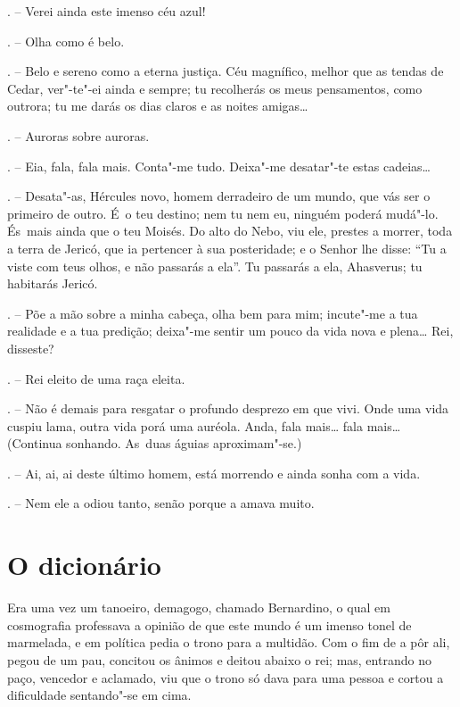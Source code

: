 \begin{Parskip}
. -- Verei ainda este imenso céu azul!

. -- Olha como é belo.

. -- Belo e sereno como a eterna justiça. Céu magnífico, melhor
que as tendas de Cedar, ver"-te"-ei ainda e sempre; tu recolherás os meus
pensamentos, como outrora; tu me darás os dias claros e as noites
amigas\ldots{}

. -- Auroras sobre auroras.

. -- Eia, fala, fala mais. Conta"-me tudo. Deixa"-me desatar"-te
estas cadeias\ldots{}

. -- Desata"-as, Hércules novo, homem derradeiro de um mundo, que
vás ser o primeiro de outro. É~o teu destino; nem tu nem eu, ninguém
poderá mudá"-lo. És~mais ainda que o teu Moisés. Do alto do Nebo, viu
ele, prestes a morrer, toda a terra de Jericó, que ia pertencer à sua
posteridade; e o Senhor lhe disse: ``Tu a viste com teus olhos, e não
passarás a ela''. Tu passarás a ela, Ahasverus; tu habitarás Jericó.

. -- Põe a mão sobre a minha cabeça, olha bem para mim;
incute"-me a tua realidade e a tua predição; deixa"-me sentir um pouco da
vida nova e plena\ldots{} Rei, disseste?

. -- Rei eleito de uma raça eleita.

. -- Não é demais para resgatar o profundo desprezo em que
vivi. Onde uma vida cuspiu lama, outra vida porá uma auréola. Anda, fala
mais\ldots{} fala mais\ldots{} (Continua sonhando. As~duas águias aproximam"-se.)

. -- Ai, ai, ai deste último homem, está morrendo e ainda sonha
com a vida.

. -- Nem ele a odiou tanto, senão porque a amava muito.
\end{Parskip}

\chapter{O dicionário}

Era uma vez um tanoeiro, demagogo, chamado Bernardino, o qual em
cosmografia professava a opinião de que este mundo é um imenso tonel de
marmelada, e em política pedia o trono para a multidão. Com o fim de a
pôr ali, pegou de um pau, concitou os ânimos e deitou abaixo o rei; mas,
entrando no paço, vencedor e aclamado, viu que o trono só dava para uma
pessoa e cortou a dificuldade sentando"-se em cima.

